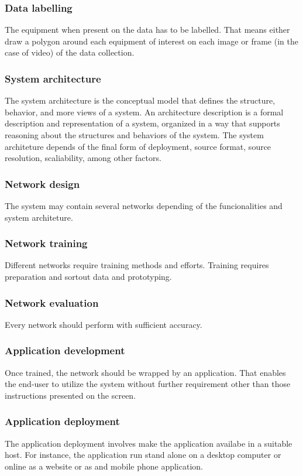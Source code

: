 \documentclass{article}
\begin{document}
\subsubsection{Data labelling}
\label{sec:orgf08f0c1}
The equipment when present on the data has to be labelled.
That means either draw a polygon around each equipment of interest on each image or frame (in the case of video) of the data collection.
\subsubsection{System architecture}
\label{sec:org1d1d138}
The system architecture is the conceptual model that defines the structure, behavior, and more views of a system.
An architecture description is a formal description and representation of a system, organized in a way that supports reasoning about the structures and behaviors of the system.
The system architeture depends of the final form of deployment, source format, source resolution, scaliability, among other factors.
\subsubsection{Network design}
\label{sec:orgb1e6e95}
The system may contain several networks depending of the funcionalities and system architeture.
\subsubsection{Network training}
\label{sec:org37388e6}
Different networks require training methods and efforts.
Training requires preparation and sortout data and prototyping.
\subsubsection{Network evaluation}
\label{sec:org2f0ea87}
Every network should perform with sufficient accuracy.
\subsubsection{Application development}
\label{sec:org2bc2d93}
Once trained, the network should be wrapped by an application.
That enables the end-user to utilize the system without further requirement other than those instructions presented on the screen.
\subsubsection{Application deployment}
\label{sec:orgcd604eb}
The application deployment involves make the application availabe in a suitable host.
For instance, the application run stand alone on a desktop computer or online as a website or as and mobile phone application.
\end{document}
